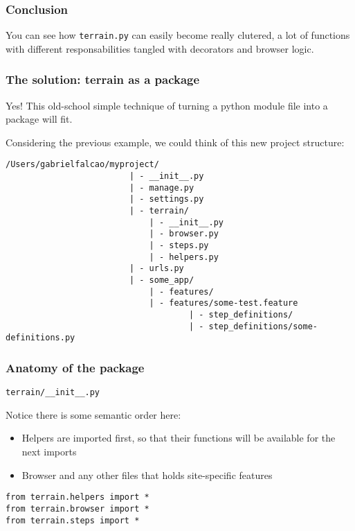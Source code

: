 \documentclass[letterpaper]{article}
\begin{document}
\subsubsection*{Conclusion}
You can see how \texttt{terrain.py} can easily become really clutered,
a lot of functions with different responsabilities tangled with
decorators and browser logic.

\subsubsection*{The solution: terrain as a package}

Yes! This old-school simple technique of turning a python module file
into a package will fit.

Considering the previous example, we could think of this new project
structure:

\newpage

\footnotesize
\begin{verbatim}
/Users/gabrielfalcao/myproject/
                         | - __init__.py
                         | - manage.py
                         | - settings.py
                         | - terrain/
                             | - __init__.py
                             | - browser.py
                             | - steps.py
                             | - helpers.py
                         | - urls.py
                         | - some_app/
                             | - features/
                             | - features/some-test.feature
                                     | - step_definitions/
                                     | - step_definitions/some-definitions.py
\end{verbatim}
\normalsize

\subsubsection*{Anatomy of the package}

\hspace{2pt}

\noindent
\large\texttt{terrain/\_\_init\_\_.py}\footnotesize

\hspace{1pt}

\noindent

Notice there is some semantic order here:
\begin{itemize}
\item{Helpers are imported first, so that their functions will be available for the next imports}
\item{Browser and any other files that holds site-specific features}
\end{itemize}
\begin{verbatim}
from terrain.helpers import *
from terrain.browser import *
from terrain.steps import *
\end{verbatim}
\end{document}
